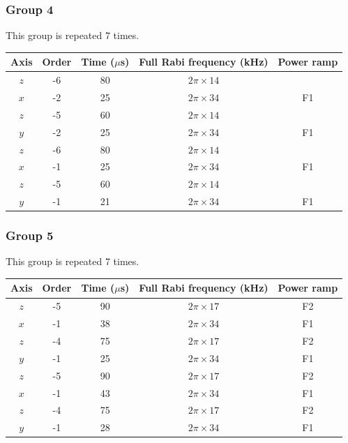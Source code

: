 \documentclass[aps,secnumarabic,amsmath,amssymb]{revtex4}
\begin{document}
\subsubsection{Group 4}
This group is repeated 7 times.
\begin{center}
  \begin{tabular}{|c|c|c|c|c|}
    \hline
    Axis&Order&Time ($\mu$s)&Full Rabi frequency (kHz)&Power ramp\\\hline
    $z$&-6&80&$2\pi\times14$&\\\hline
    $x$&-2&25&$2\pi\times34$&F1\\\hline
    $z$&-5&60&$2\pi\times14$&\\\hline
    $y$&-2&25&$2\pi\times34$&F1\\\hline
    $z$&-6&80&$2\pi\times14$&\\\hline
    $x$&-1&25&$2\pi\times34$&F1\\\hline
    $z$&-5&60&$2\pi\times14$&\\\hline
    $y$&-1&21&$2\pi\times34$&F1\\\hline
  \end{tabular}
\end{center}
\subsubsection{Group 5}
This group is repeated 7 times.
\begin{center}
  \begin{tabular}{|c|c|c|c|c|}
    \hline
    Axis&Order&Time ($\mu$s)&Full Rabi frequency (kHz)&Power ramp\\\hline
    $z$&-5&90&$2\pi\times17$&F2\\\hline
    $x$&-1&38&$2\pi\times34$&F1\\\hline
    $z$&-4&75&$2\pi\times17$&F2\\\hline
    $y$&-1&25&$2\pi\times34$&F1\\\hline
    $z$&-5&90&$2\pi\times17$&F2\\\hline
    $x$&-1&43&$2\pi\times34$&F1\\\hline
    $z$&-4&75&$2\pi\times17$&F2\\\hline
    $y$&-1&28&$2\pi\times34$&F1\\\hline
  \end{tabular}
\end{center}
\end{document}
